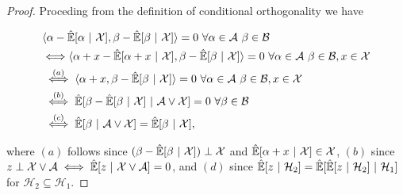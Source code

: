 \documentclass[12pt]{article}
\def\H{\mathcal{H}}  %
\newcommand{\linE}[2]{\hat{\E}[#1\ |\ #2]}  %
\begin{document}
\begin{proof}
  Proceding from the definition of conditional orthogonality we have

  \begin{align*}
    &\inner{\alpha - \linE{\alpha}{\mathcal{X}}}{\beta - \linE{\beta}{\mathcal{X}}} = 0 \ \forall \alpha \in \mathcal{A}\ \beta \in \mathcal{B}\\
    &{\iff} \inner{\alpha + x - \linE{\alpha + x}{\mathcal{X}}}{\beta - \linE{\beta}{\mathcal{X}}} = 0 \ \forall \alpha \in \mathcal{A}\ \beta \in \mathcal{B}, x \in \mathcal{X}\\
    &\overset{(a)}{\iff} \inner{\alpha + x}{\beta - \linE{\beta}{\mathcal{X}}} = 0 \ \forall \alpha \in \mathcal{A}\ \beta \in \mathcal{B}, x \in \mathcal{X}\\
    &\overset{(b)}{\iff} \linE{\beta - \linE{\beta}{\mathcal{X}}}{\mathcal{A} \vee \mathcal{X}} = 0\ \forall \beta \in \mathcal{B}\\
    &\overset{(c)}{\iff} \linE{\beta}{\mathcal{A} \vee \mathcal{X}} = \linE{\beta}{\mathcal{X}},
  \end{align*}

  where $(a)$ follows since $(\beta - \linE{\beta}{\mathcal{X}}) \perp \mathcal{X}$ and $\linE{\alpha + x}{\mathcal{X}} \in \mathcal{X}$, $(b)$ since $z \perp \mathcal{X} \vee \mathcal{A} \iff \linE{z}{\mathcal{X} \vee \mathcal{A}} = 0$, and $(d)$ since $\linE{z}{\H_2} = \linE{\linE{z}{\H_2}}{\H_1}$ for $\H_2 \subseteq \H_1$.
  

\end{proof}
\end{document}
